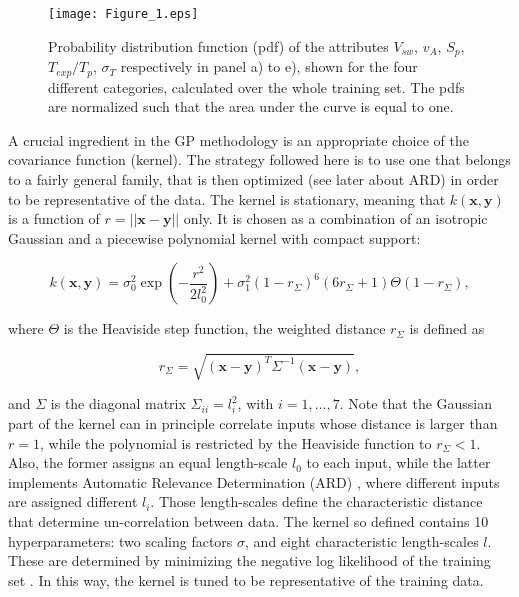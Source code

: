 \documentclass[draft,jgrga]{agutex}
\begin{document}
\begin{article}
\begin{figure}[ht!]
 \centering
 \texttt{[image: Figure\_1.eps]}
 \caption{Probability distribution function (pdf) of the attributes $V_{sw}$, $v_A$, $S_p$, $T_{exp}/T_p$, $\sigma_T$ respectively in panel a) to e), shown for the four different categories, calculated over the whole training set. The pdfs are normalized such that the area under the curve is equal to one.}\label{fig:pdf}
\end{figure}

A crucial ingredient in the GP methodology is an appropriate choice of the covariance function (kernel). The strategy followed here is to use one that belongs to a fairly general family, that is then optimized (see later about ARD) in order to be representative of the data.
The kernel is stationary, meaning that $k(\mathbf{x},\mathbf{y})$ is a function of $r=||\mathbf{x}-\mathbf{y}||$ only. It is chosen as a combination of an isotropic Gaussian and a piecewise polynomial kernel with compact support:
\begin{linenomath*}
\begin{equation}
 k(\mathbf{x},\mathbf{y}) = \sigma_0^2\exp\left(-\frac{r^2}{2l_0^2}\right) + \sigma_1^2(1-r_\Sigma)^6(6r_\Sigma+1) \Theta(1-r_\Sigma),
\end{equation}
\end{linenomath*}
where $\Theta$ is the Heaviside step function, the weighted distance $r_\Sigma$ is defined as
\begin{linenomath*}
\begin{equation}
 r_\Sigma = \sqrt{(\mathbf{x}-\mathbf{y})^T\Sigma^{-1}(\mathbf{x}-\mathbf{y})},
\end{equation}
\end{linenomath*}
and $\Sigma$ is the diagonal matrix $\Sigma_{ii}=l_i^2$, with $i=1,\ldots,7$.
Note that the Gaussian part of the kernel can in principle correlate inputs whose distance is larger than $r=1$, while the polynomial is restricted by the Heaviside function to $r_\Sigma<1$. Also, the former assigns an equal length-scale $l_0$ to each input, while the latter implements Automatic Relevance Determination (ARD) \citep{mackay96, neal12}, where different inputs are assigned different $l_i$. Those length-scales define the characteristic distance that determine un-correlation between data. 
The kernel so defined contains 10 hyperparameters: two scaling factors $\sigma$, and eight characteristic length-scales $l$. These are determined by minimizing the negative log likelihood of the training set \citep{rasmussen2006}. In this way, the kernel is tuned to be representative of the training data. 


\end{article}
\end{document}

